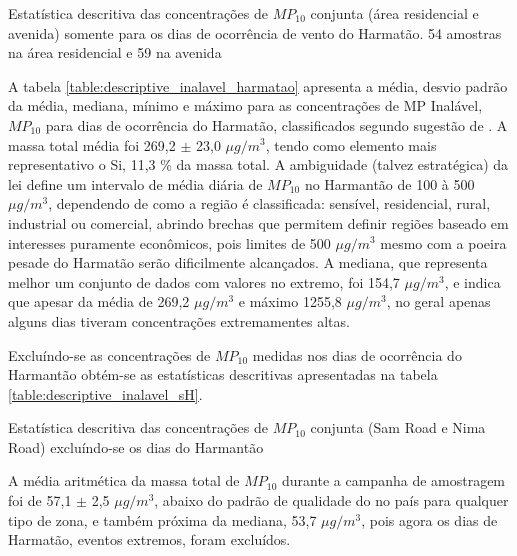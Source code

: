 \begin{table}[H]
  \centering
  
  \caption{Estatística descritiva das concentrações de $MP_{10}$ conjunta
           (área residencial e avenida) somente para os dias de ocorrência 
           de vento do Harmatão. 54 amostras na área residencial e 59 na avenida 
          \label{table:descriptive_inalavel_harmatao}}
\end{table}

A tabela \ref{table:descriptive_inalavel_harmatao} apresenta a média, 
desvio padrão da média, mediana, mínimo e máximo para as concentrações de 
MP Inalável, $MP_{10}$ para dias de ocorrência do Harmatão, classificados
segundo sugestão de \citet{aboh2009}. A massa total média foi 269,2 $\pm$ 23,0
$\mu g/ m^3$, tendo como elemento mais representativo o Si, 11,3 \% da massa total. 
A ambiguidade (talvez estratégica) da lei define um intervalo de média diária 
de $MP_{10}$ no Harmantão de 100 à 500 $\mu g/ m^3$, dependendo de como a região
é classificada: sensível, residencial, rural, industrial ou comercial, abrindo
brechas que permitem definir regiões baseado em interesses puramente econômicos,
pois limites de 500 $\mu g/ m^3$ mesmo com a poeira pesade do Harmatão serão
dificilmente alcançados. A mediana, que representa melhor um conjunto de dados
com valores no extremo, foi 154,7 $\mu g/ m^3$, e indica que apesar da média 
de 269,2 $\mu g/ m^3$ e máximo 1255,8 $\mu g/ m^3$, no geral apenas alguns
dias tiveram concentrações extremamentes altas. 

Excluíndo-se as concentrações de $MP_{10}$ medidas nos dias de 
ocorrência do Harmantão obtém-se as estatísticas descritivas apresentadas na 
tabela \ref{table:descriptive_inalavel_sH}.

\begin{table}[H]
  \centering
    
  \caption{Estatística descritiva das concentrações de $MP_{10}$ conjunta 
           (Sam Road e Nima Road) excluíndo-se os dias do Harmantão
            \label{table:descriptive_inalavel_sH}}
\end{table}

A média aritmética da massa total de $MP_{10}$ durante a campanha de amostragem 
foi de 57,1 $\pm$ 2,5 $\mu g/ m^3$, abaixo do padrão de qualidade do no país 
para qualquer tipo de zona, e também próxima da mediana, 53,7 $\mu g/ m^3$, 
pois agora os dias de Harmatão, eventos extremos, foram excluídos.  


